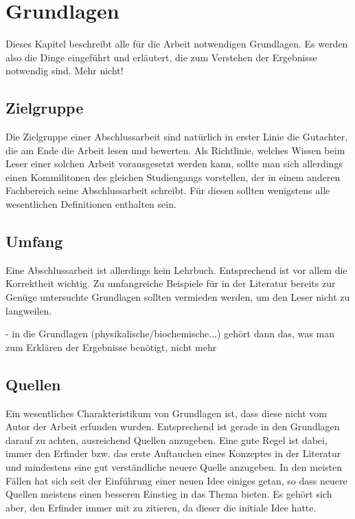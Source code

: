 
\chapter{Grundlagen}
\label{chapter:basics}

Dieses Kapitel beschreibt alle für die Arbeit notwendigen Grundlagen. Es werden also die Dinge eingeführt und erläutert, die zum Verstehen der Ergebnisse notwendig sind. Mehr nicht!



\section{Zielgruppe}

Die Zielgruppe einer Abschlussarbeit sind natürlich in erster Linie die Gutachter, die am Ende die Arbeit lesen und bewerten. Als Richtlinie, welches Wissen beim Leser einer solchen Arbeit vorausgesetzt werden kann, sollte man sich allerdings einen Kommilitonen des gleichen Studiengangs vorstellen, der in einem anderen Fachbereich seine Abschlussarbeit schreibt. Für diesen sollten wenigstens alle wesentlichen Definitionen enthalten sein.

\section{Umfang}

Eine Abschlussarbeit ist allerdings kein Lehrbuch. Entsprechend ist vor allem die Korrektheit wichtig. Zu umfangreiche Beispiele für in der Literatur bereits zur Genüge untersuchte Grundlagen sollten vermieden werden, um den Leser nicht zu langweilen.

- in die Grundlagen (physikalische/biochemische...) gehört dann das, was man zum Erklären der Ergebnisse benötigt, nicht mehr

\section{Quellen}

Ein wesentliches Charakteristikum von Grundlagen ist, dass diese nicht vom Autor der Arbeit erfunden wurden. Entsprechend ist gerade in den Grundlagen darauf zu achten, ausreichend Quellen anzugeben. Eine gute Regel ist dabei, immer den Erfinder bzw. das erste Auftauchen eines Konzeptes in der Literatur und mindestens eine gut verständliche neuere Quelle anzugeben. In den meisten Fällen hat sich seit der Einführung einer neuen Idee einiges getan, so dass neuere Quellen meistens einen besseren Einstieg in das Thema bieten. Es gehört sich aber, den Erfinder immer mit zu zitieren, da dieser die initiale Idee hatte.

